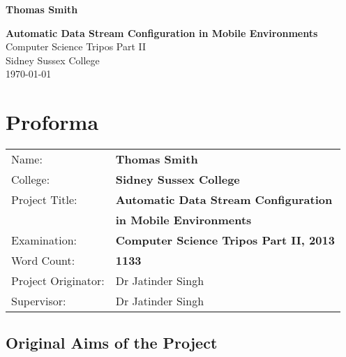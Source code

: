 \documentclass[12pt,twoside,notitlepage]{report}
\begin{document}





\pagestyle{empty}

\hfill{\LARGE \bf Thomas Smith}

\vspace*{60mm}
\begin{center}
\Huge
{\bf Automatic Data Stream Configuration in Mobile Environments} \\
\vspace*{5mm}
Computer Science Tripos Part II \\
\vspace*{5mm}
Sidney Sussex College \\
\vspace*{5mm}
\today  %
\end{center}

\cleardoublepage


\setcounter{page}{1}
\pagestyle{plain}

\chapter*{Proforma}

{\large
\begin{tabular}{ll}
Name:               & \bf Thomas Smith	\\
College:            & \bf Sidney Sussex College	\\
Project Title:      & \bf Automatic Data Stream Configuration \\ &\bf in Mobile Environments	\\
Examination:        & \bf Computer Science Tripos Part II, 2013 	\\
Word Count:         & \bf 1133\footnotemark[1] \\
Project Originator: & Dr Jatinder Singh		\\
Supervisor:         & Dr Jatinder Singh		\\ 
\end{tabular}
}



\section*{Original Aims of the Project}
\end{document}
